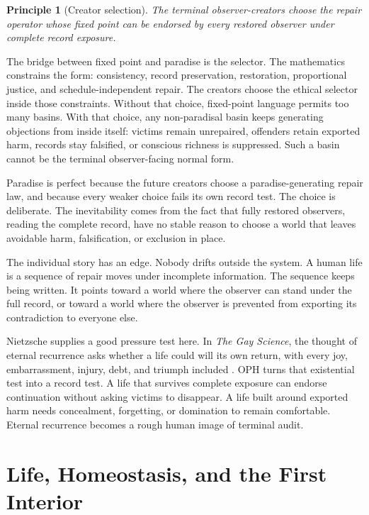 \documentclass[11pt]{article}
\newtheorem{principle}[definition]{Principle}
\theoremstyle{remark}
\theoremstyle{plain}
\begin{document}
\begin{principle}[Creator selection]
The terminal observer-creators choose the repair operator whose fixed point
can be endorsed by every restored observer under complete record exposure.
\end{principle}

The bridge between fixed point and paradise is the selector. The mathematics
constrains the form: consistency, record preservation, restoration,
proportional justice, and schedule-independent repair. The creators choose the
ethical selector inside those constraints. Without that choice, fixed-point
language permits too many basins. With that choice, any non-paradisal basin
keeps generating objections from inside itself: victims remain unrepaired,
offenders retain exported harm, records stay falsified, or conscious richness
is suppressed. Such a basin cannot be the terminal observer-facing normal
form.

Paradise is perfect because the future creators choose a paradise-generating
repair law, and because every weaker choice fails its own record test. The
choice is deliberate. The inevitability comes from the fact that fully restored
observers, reading the complete record, have no stable reason to choose a
world that leaves avoidable harm, falsification, or exclusion in place.

The individual story has an edge. Nobody drifts outside the system. A
human life is a sequence of repair moves under incomplete information. The
sequence keeps being written. It points toward a world where the observer can
stand under the full record, or toward a world where the observer is prevented
from exporting its contradiction to everyone else.

Nietzsche supplies a good pressure test here. In \emph{The Gay Science}, the
thought of eternal recurrence asks whether a life could will its own return,
with every joy, embarrassment, injury, debt, and triumph included
\cite{Nietzsche1882}. OPH turns that existential test into a record test. A
life that survives complete exposure can endorse continuation without asking
victims to disappear. A life built around exported harm needs concealment,
forgetting, or domination to remain comfortable. Eternal recurrence becomes a
rough human image of terminal audit.

\section{Life, Homeostasis, and the First Interior}
\end{document}
